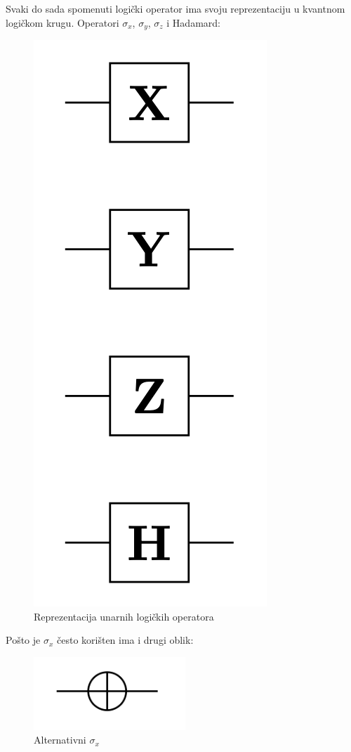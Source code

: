 Svaki do sada spomenuti logički operator ima svoju reprezentaciju u kvantnom logičkom krugu. Operatori $\sigma_x$, $\sigma_y$, $\sigma_z$ i Hadamard:
\begin{figure}[H]
\centering
\includegraphics[scale=0.3]{img/xyzh.png}
\caption{Reprezentacija unarnih logičkih operatora} 
\end{figure}
Pošto je $\sigma_x$ često korišten ima i drugi oblik:
\begin{figure}[H]
\centering
\includegraphics[scale=0.4]{img/xop.png}
\caption{Alternativni $\sigma_x$} 
\end{figure}
